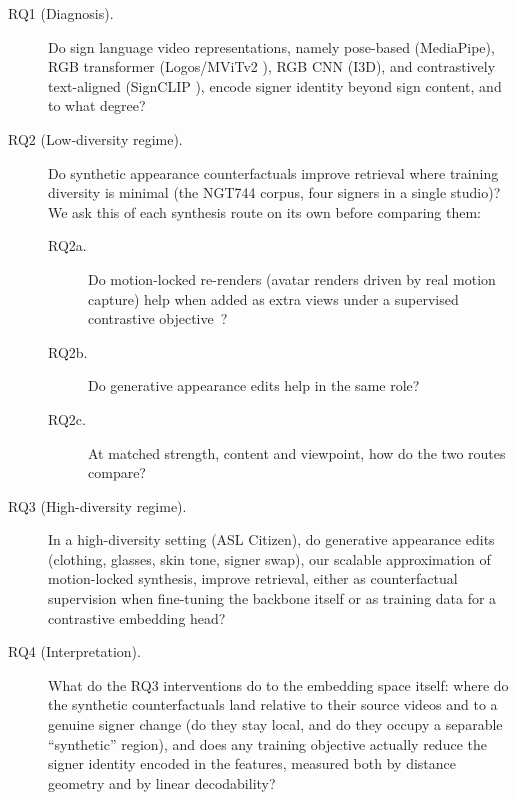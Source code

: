\begin{description}
\item[RQ1 (Diagnosis).] Do sign language video representations, namely pose-based
  (MediaPipe), RGB transformer
  (Logos/MViTv2 \cite{ovodovLogosWellTemperedPretrain2025}), RGB CNN (I3D),
  and contrastively text-aligned (SignCLIP \cite{jiangSignCLIPConnectingText2024}),
  encode signer identity beyond sign content, and to what degree?

\item[RQ2 (Low-diversity regime).] Do synthetic appearance
  counterfactuals improve retrieval where training diversity is minimal
  (the NGT744 corpus, four signers in a single studio)? We ask this of
  each synthesis route on its own before comparing them:
  \begin{description}
  \item[RQ2a.] Do motion-locked re-renders (avatar renders driven by real
    motion capture) help when added as extra views under a supervised
    contrastive objective~\cite{khosla2020supervised}?
  \item[RQ2b.] Do generative appearance edits help in the same role?
  \item[RQ2c.] At matched strength, content and viewpoint, how do the two
    routes compare?
  \end{description}

\item[RQ3 (High-diversity regime).] In a high-diversity setting (ASL
  Citizen), do generative appearance edits
  (clothing, glasses, skin tone, signer swap), our
  scalable approximation of motion-locked synthesis, improve
  retrieval, either as counterfactual supervision when fine-tuning the backbone itself or as training data for a contrastive embedding head?

\item[RQ4 (Interpretation).] What do the RQ3 interventions do
  to the embedding space itself: where do the synthetic counterfactuals
  land relative to their source videos and to a genuine signer change
  (do they stay local, and do they occupy a separable ``synthetic'' region),
  and does any training objective actually reduce the signer identity
  encoded in the features, measured both by distance geometry and by
  linear decodability?
\end{description}



